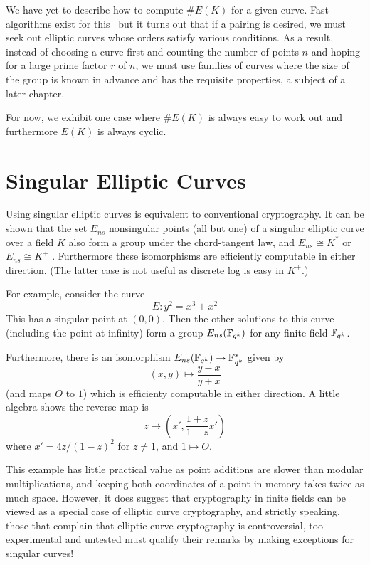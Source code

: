 We have yet to describe how to compute $\#E(K)$ for a given curve.
Fast algorithms exist for this~\cite{bss}
but it turns out that if a pairing is desired, we must seek out
elliptic curves whose orders satisfy various conditions.
As a result,
instead of choosing a curve first and counting the number of points $n$ and
hoping for a large prime factor $r$ of $n$,
we must use families of curves where the size of the group
is known in advance and has the requisite properties,
a subject of a later chapter.

For now, we exhibit one case where $\#E(K)$ is always easy to work out
and furthermore $E(K)$ is always cyclic.

\section {Singular Elliptic Curves}

Using singular elliptic curves
is equivalent to conventional cryptography.
It can be shown that the set $E_{ns}$ nonsingular points (all but
one) of a singular elliptic curve over a field $K$
also form a group under the chord-tangent law,
and $E_{ns} \cong K^*$ or $E_{ns} \cong K^+$ \cite[Proposition 2.5]{silverman}.
Furthermore these isomorphisms are efficiently computable in either
direction.
(The latter case is not useful as discrete log is easy in $K^+$.)

For example, consider the curve
\[ E : y^2 = x^3 + x^2 \]
This has a singular point at $(0,0)$. Then the other solutions to
this curve (including the point at infinity) form a group
$E_{ns}(\mathbb{F}_{q^k})$ for any finite field $\mathbb{F}_{q^k}$.

Furthermore, there is an isomorphism $E_{ns}(\mathbb{F}_{q^k}) \rightarrow \mathbb{F}_{q^k}^*$
given by
\[ (x,y) \mapsto \frac{y-x}{y+x} \]
(and maps $O$ to $1$)
which is efficienty computable in either direction.
A little algebra
shows the reverse map is
\[ z \mapsto \left( x', \frac{1+z}{1-z} x' \right) \]
where $x' = 4z/(1-z)^2$ for $z \ne 1$, and $1 \mapsto O$.

This example has little practical value as point additions are slower than
modular multiplications, and keeping both coordinates of a point in memory
takes twice as much space. However, it does suggest
that cryptography in finite fields can be viewed as a special
case of elliptic curve cryptography, and strictly speaking,
those that complain that elliptic curve cryptography is controversial,
too experimental and untested must qualify
their remarks by making exceptions for singular curves!

